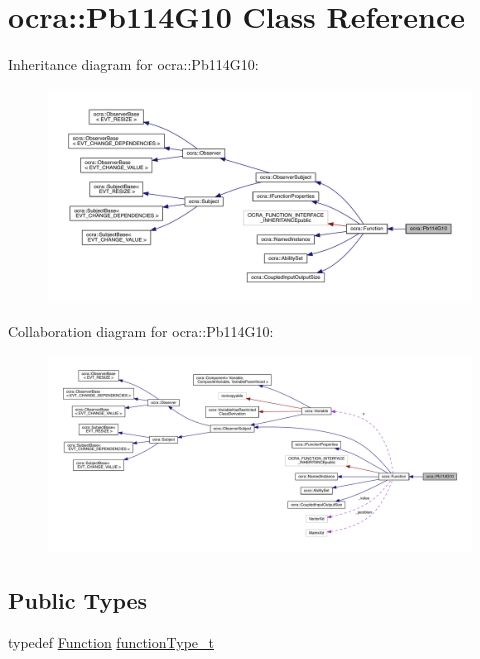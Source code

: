 \hypertarget{classocra_1_1Pb114G10}{}\section{ocra\+:\+:Pb114\+G10 Class Reference}
\label{classocra_1_1Pb114G10}


Inheritance diagram for ocra\+:\+:Pb114\+G10\+:\nopagebreak
\begin{figure}[H]
\begin{center}
\leavevmode
\includegraphics[width=350pt]{d5/d32/classocra_1_1Pb114G10__inherit__graph}
\end{center}
\end{figure}


Collaboration diagram for ocra\+:\+:Pb114\+G10\+:\nopagebreak
\begin{figure}[H]
\begin{center}
\leavevmode
\includegraphics[width=350pt]{d7/d0d/classocra_1_1Pb114G10__coll__graph}
\end{center}
\end{figure}
\subsection*{Public Types}
\begin{DoxyCompactItemize}
\item 
typedef \hyperlink{classocra_1_1Function}{Function} \hyperlink{classocra_1_1Pb114G10_abefa27aa6362ee95d59c39654bd7ab2f}{function\+Type\+\_\+t}
\end{DoxyCompactItemize}
